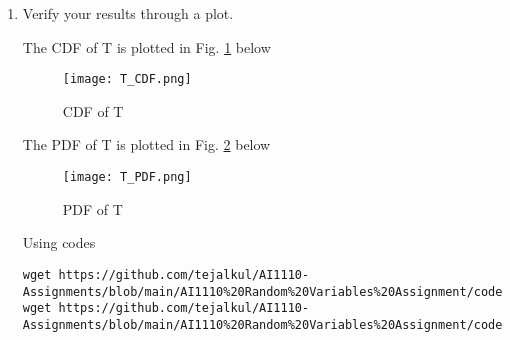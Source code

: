 \documentclass[journal,12pt,twocolumn]{IEEEtran}
\renewcommand\thesection{\arabic{section}}
\begin{document}
\begin{enumerate}[label=\thesection.\arabic*
,ref=\thesection.\theenumi]
\begin{align}
           &= \int_{0}^{T} T\,dT  \\
           &= \frac{T^2}{2}
\end{align}
If $1 < T \leq 2 $,
\begin{align}
    F_T(T) &= \int_{0}^{1} f_{T}\brak{T}\,dT  + \int_{1}^{T} f_{T}\brak{T}\,dT  \\
           &= \int_{0}^{1} T\,dT  + \int_{1}^{T} (2 - T)\,dT  \\
           &= \frac{1}{2} + \frac{4T - T^2 - 3}{2} \\
           &= 1 - \frac{(2-T)^2}{2}
\end{align}
If $ T > 2 $,
\begin{align}
    F_T(T) &= \int_{2}^{T} f_{T}\brak{T}\,dT  \\
           &= \int_{2}^{T} 0\,dT  \\
           &= 0
\end{align}
\begin{align}  
F_{T}\brak{T} = 
\begin{cases}
\frac{T^2}{2}, & 0 \leq T \leq 1 \\
1 - \frac{(2-T)^2}{2}, & 1 < T \leq 2 \\
0, & \text{otherwise}
\end{cases}
\end{align}
\item Verify your results through a plot. 

\solution
The CDF of T is plotted in Fig. \ref{Fig:tria_cdf} below 
\begin{figure}[!ht]
\texttt{[image: T\_CDF.png]}
\caption{CDF of T}
\label{Fig:tria_cdf}
\end{figure}

The PDF of T is plotted in Fig. \ref{Fig:tria_pdf} below 
\begin{figure}[!ht]
\texttt{[image: T\_PDF.png]}
\caption{PDF of T}
\label{Fig:tria_pdf}
\end{figure} 

Using codes
\begin{lstlisting}
wget https://github.com/tejalkul/AI1110-Assignments/blob/main/AI1110%20Random%20Variables%20Assignment/codes/cdf_plot.py
wget https://github.com/tejalkul/AI1110-Assignments/blob/main/AI1110%20Random%20Variables%20Assignment/codes/pdf_plot.py
\end{lstlisting}
\end{enumerate}
\end{document}
